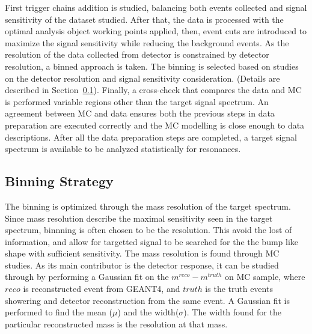 First trigger chains addition is studied, balancing both events collected and signal sensitivity of the dataset studied. After that, the data is processed with the optimal analysis object working points applied, then, event cuts are introduced to maximize the signal sensitivity while reducing the background events. As the resolution of the data collected from detector is constrained by detector resolution, a binned approach is taken. The binning is selected based on studies on the detector resolution and signal sensitivity consideration. (Details are described in Section~\ref{sec:binning}). Finally, a cross-check that compares the data and MC is performed variable regions other than the target signal spectrum. An agreement between MC and data ensures both the previous steps in data preparation are executed correctly and the MC modelling is close enough to data descriptions. After all the data preparation steps are completed, a target signal spectrum is available to be analyzed statistically for resonances. 

\subsection{Binning Strategy} 
\label{sec:binning}

The binning is optimized through the mass resolution of the target spectrum. Since mass resolution describe the maximal sensitivity seen in the target spectrum, binnning is often chosen to be the resolution. This avoid the lost of information, and allow for targetted signal to be searched for the the bump like shape with sufficient sensitivity.
The mass resolution is found through MC studies. As its main contributor is the detector response, it can be studied through by performing a Gaussian fit on the $m^{reco}-m^{truth}$ on MC sample, where $reco$ is reconstructed event from GEANT4, and $truth$ is the truth events showering and detector reconstruction from the same event.
A Gaussian fit is performed to find the mean ($\mu$) and the width($\sigma$). The width found for the particular reconstructed mass is the resolution at that mass. 


